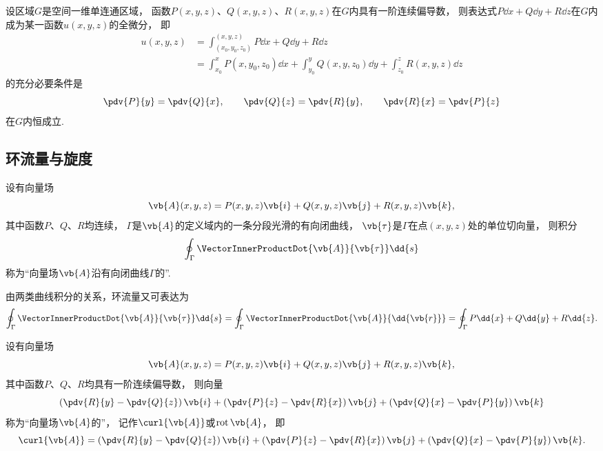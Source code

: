 \begin{theorem}\label{theorem:线积分与面积分.与路径无关的空间曲线积分}
设区域\(G\)是空间一维单连通区域，
函数\(P(x,y,z)\)、\(Q(x,y,z)\)、\(R(x,y,z)\)在\(G\)内具有一阶连续偏导数，
则表达式\(P\dd{x}+Q\dd{y}+R\dd{z}\)在\(G\)内成为某一函数\(u(x,y,z)\)的全微分，
即\begin{align*}
	u(x,y,z)
	&= \int_{(x_0,y_0,z_0)}^{(x,y,z)}
	P\dd{x}+Q\dd{y}+R\dd{z} \\
	&= \int_{x_0}^x P(x,y_0,z_0) \dd{x}
	+ \int_{y_0}^y Q(x,y,z_0) \dd{y}
	+ \int_{z_0}^z R(x,y,z) \dd{z}
\end{align*}的充分必要条件是\begin{equation*}
	\pdv{P}{y}=\pdv{Q}{x}, \qquad
	\pdv{Q}{z}=\pdv{R}{y}, \qquad
	\pdv{R}{x}=\pdv{P}{z}
\end{equation*}在\(G\)内恒成立.
\end{theorem}

\subsection{环流量与旋度}
\begin{definition}
设有向量场\begin{equation*}
\vb{A}(x,y,z)=P(x,y,z)\vb{i}+Q(x,y,z)\vb{j}+R(x,y,z)\vb{k},
\end{equation*}其中函数\(P\)、\(Q\)、\(R\)均连续，
\(\Gamma\)是\(\vb{A}\)的定义域内的一条分段光滑的有向闭曲线，
\(\vb{\tau}\)是\(\Gamma\)在点\((x,y,z)\)处的单位切向量，
则积分\begin{equation*}
	\oint_\Gamma \VectorInnerProductDot{\vb{A}}{\vb{\tau}} \dd{s}
\end{equation*}称为“向量场\(\vb{A}\)沿有向闭曲线\(\Gamma\)的”.
\end{definition}
由两类曲线积分的关系，环流量又可表达为\begin{equation*}
	\oint_\Gamma \VectorInnerProductDot{\vb{A}}{\vb{\tau}} \dd{s}
	=\oint_\Gamma \VectorInnerProductDot{\vb{A}}{\dd{\vb{r}}}
	=\oint_\Gamma P\dd{x}+Q\dd{y}+R\dd{z}.
\end{equation*}

\begin{definition}
设有向量场\begin{equation*}
	\vb{A}(x,y,z)=P(x,y,z)\vb{i}+Q(x,y,z)\vb{j}+R(x,y,z)\vb{k},
\end{equation*}
其中函数\(P\)、\(Q\)、\(R\)均具有一阶连续偏导数，
则向量\begin{equation*}
	\left( \pdv{R}{y} - \pdv{Q}{z} \right)\vb{i}
	+\left( \pdv{P}{z} - \pdv{R}{x} \right)\vb{j}
	+\left( \pdv{Q}{x} - \pdv{P}{y} \right)\vb{k}
\end{equation*}
称为“向量场\(\vb{A}\)的”，
记作\(\curl{\vb{A}}\)或\(\operatorname{rot}\vb{A}\)，
即\begin{equation*}
	\curl{\vb{A}}
	=\left( \pdv{R}{y} - \pdv{Q}{z} \right)\vb{i}
	+\left( \pdv{P}{z} - \pdv{R}{x} \right)\vb{j}
	+\left( \pdv{Q}{x} - \pdv{P}{y} \right)\vb{k}.
\end{equation*}
\end{definition}

